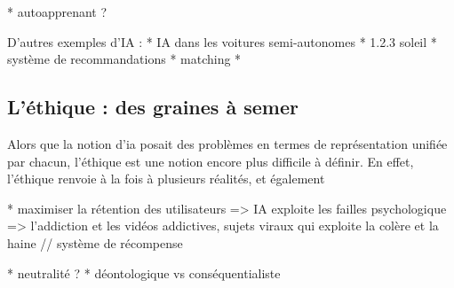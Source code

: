 * autoapprenant ?

D'autres exemples d'IA :
* IA dans les voitures semi-autonomes
* 1.2.3 soleil
* système de recommandations
* matching
*



\subsection{L'éthique : des graines à semer}\label{subsection:ethique}

Alors que la notion d'\gls{ia} posait des problèmes en termes de représentation unifiée par chacun, l'éthique est une notion encore plus difficile à définir. En effet, l'éthique renvoie à la fois à plusieurs réalités, et également
\cite{ethique-cnil}
\pagebreak

* maximiser la rétention des utilisateurs => IA exploite les failles psychologique => l'addiction et les vidéos addictives, sujets viraux qui exploite la colère et la haine // système de récompense

* neutralité ?
* déontologique vs conséquentialiste
